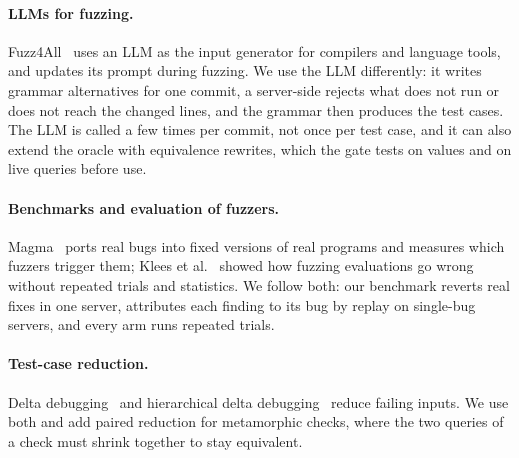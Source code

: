 \paragraph{LLMs for fuzzing.} Fuzz4All~\cite{xia2024fuzz4all} uses an LLM as
the input generator for compilers and language tools, and updates its prompt
during fuzzing. We use the LLM differently: it writes grammar alternatives
for one commit, a server-side \gate rejects what does not run or does not
reach the changed lines, and the grammar then produces the test cases. The
LLM is called a few times per commit, not once per test case, and it can
also extend the oracle with equivalence rewrites, which the gate tests on
values and on live queries before use.

\paragraph{Benchmarks and evaluation of fuzzers.} Magma~\cite{hazimeh2020magma}
ports real bugs into fixed versions of real programs and measures which
fuzzers trigger them; Klees et al.~\cite{klees2018evaluating} showed how
fuzzing evaluations go wrong without repeated trials and statistics. We follow
both: our benchmark reverts real fixes in one server, attributes each finding
to its bug by replay on single-bug servers, and every arm runs repeated trials.

\paragraph{Test-case reduction.} Delta debugging~\cite{zeller2002dd} and
hierarchical delta debugging~\cite{misherghi2006hdd} reduce failing inputs.
We use both and add paired reduction for metamorphic checks, where the two
queries of a check must shrink together to stay equivalent.

